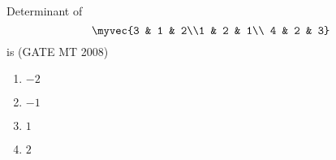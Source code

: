 \item Determinant of $$\myvec{3 & 1 & 2\\1 & 2 & 1\\ 4 & 2 & 3}$$
is
\hfill(GATE MT 2008)
\begin{multicols}{4}
\begin{enumerate}
\item $-2$
\item $-1$ 
\item $1$
\item $2$
\end{enumerate}
\end{multicols}

